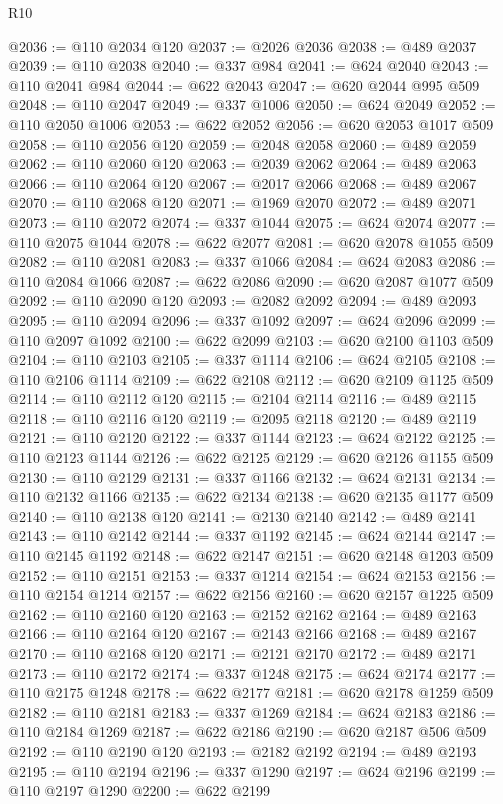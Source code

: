 \begin{lexlean}{R10}
\begin{coremodule}
@2036 := @110 @2034 @120
@2037 := @2026 @2036
@2038 := @489 @2037
@2039 := @110 @2038
@2040 := @337 @984
@2041 := @624 @2040
@2043 := @110 @2041 @984
@2044 := @622 @2043
@2047 := @620 @2044 @995 @509
@2048 := @110 @2047
@2049 := @337 @1006
@2050 := @624 @2049
@2052 := @110 @2050 @1006
@2053 := @622 @2052
@2056 := @620 @2053 @1017 @509
@2058 := @110 @2056 @120
@2059 := @2048 @2058
@2060 := @489 @2059
@2062 := @110 @2060 @120
@2063 := @2039 @2062
@2064 := @489 @2063
@2066 := @110 @2064 @120
@2067 := @2017 @2066
@2068 := @489 @2067
@2070 := @110 @2068 @120
@2071 := @1969 @2070
@2072 := @489 @2071
@2073 := @110 @2072
@2074 := @337 @1044
@2075 := @624 @2074
@2077 := @110 @2075 @1044
@2078 := @622 @2077
@2081 := @620 @2078 @1055 @509
@2082 := @110 @2081
@2083 := @337 @1066
@2084 := @624 @2083
@2086 := @110 @2084 @1066
@2087 := @622 @2086
@2090 := @620 @2087 @1077 @509
@2092 := @110 @2090 @120
@2093 := @2082 @2092
@2094 := @489 @2093
@2095 := @110 @2094
@2096 := @337 @1092
@2097 := @624 @2096
@2099 := @110 @2097 @1092
@2100 := @622 @2099
@2103 := @620 @2100 @1103 @509
@2104 := @110 @2103
@2105 := @337 @1114
@2106 := @624 @2105
@2108 := @110 @2106 @1114
@2109 := @622 @2108
@2112 := @620 @2109 @1125 @509
@2114 := @110 @2112 @120
@2115 := @2104 @2114
@2116 := @489 @2115
@2118 := @110 @2116 @120
@2119 := @2095 @2118
@2120 := @489 @2119
@2121 := @110 @2120
@2122 := @337 @1144
@2123 := @624 @2122
@2125 := @110 @2123 @1144
@2126 := @622 @2125
@2129 := @620 @2126 @1155 @509
@2130 := @110 @2129
@2131 := @337 @1166
@2132 := @624 @2131
@2134 := @110 @2132 @1166
@2135 := @622 @2134
@2138 := @620 @2135 @1177 @509
@2140 := @110 @2138 @120
@2141 := @2130 @2140
@2142 := @489 @2141
@2143 := @110 @2142
@2144 := @337 @1192
@2145 := @624 @2144
@2147 := @110 @2145 @1192
@2148 := @622 @2147
@2151 := @620 @2148 @1203 @509
@2152 := @110 @2151
@2153 := @337 @1214
@2154 := @624 @2153
@2156 := @110 @2154 @1214
@2157 := @622 @2156
@2160 := @620 @2157 @1225 @509
@2162 := @110 @2160 @120
@2163 := @2152 @2162
@2164 := @489 @2163
@2166 := @110 @2164 @120
@2167 := @2143 @2166
@2168 := @489 @2167
@2170 := @110 @2168 @120
@2171 := @2121 @2170
@2172 := @489 @2171
@2173 := @110 @2172
@2174 := @337 @1248
@2175 := @624 @2174
@2177 := @110 @2175 @1248
@2178 := @622 @2177
@2181 := @620 @2178 @1259 @509
@2182 := @110 @2181
@2183 := @337 @1269
@2184 := @624 @2183
@2186 := @110 @2184 @1269
@2187 := @622 @2186
@2190 := @620 @2187 @506 @509
@2192 := @110 @2190 @120
@2193 := @2182 @2192
@2194 := @489 @2193
@2195 := @110 @2194
@2196 := @337 @1290
@2197 := @624 @2196
@2199 := @110 @2197 @1290
@2200 := @622 @2199

\end{coremodule}
\end{lexlean}

